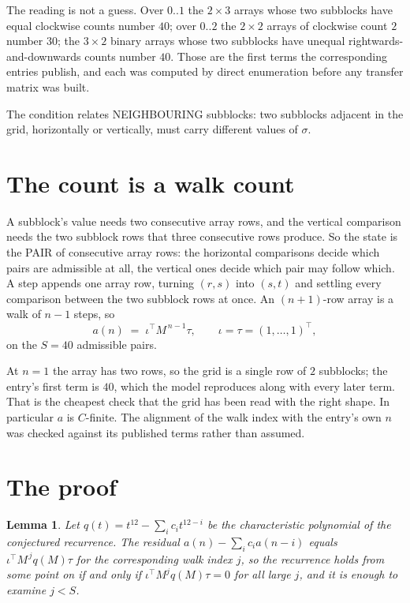 \documentclass[11pt,a4paper]{article}
\theoremstyle{plain}
\newtheorem{lemma}[theorem]{Lemma}
\theoremstyle{definition}
\begin{document}
The reading is not a guess. Over $0..1$ the $2\times3$ arrays whose two subblocks have equal
clockwise counts number $40$; over $0..2$ the $2\times2$ arrays of clockwise count $2$ number
$30$; the $3\times2$ binary arrays whose two subblocks have unequal rightwards-and-downwards
counts number $40$. Those are the first terms the corresponding entries publish, and each was
computed by direct enumeration before any transfer matrix was built.

The condition relates NEIGHBOURING subblocks: two subblocks adjacent in the grid, horizontally
or vertically, must carry different values of $\sigma$.

\section{The count is a walk count}

A subblock's value needs two consecutive array rows, and the vertical
comparison needs the two subblock rows that three consecutive rows produce. So the state is the
PAIR of consecutive array rows: the horizontal comparisons decide which pairs are admissible at
all, the vertical ones decide which pair may follow which. A step appends one array row,
turning $(r,s)$ into $(s,t)$ and settling every comparison between the two subblock rows at
once. An $(n+1)$-row array is a walk of $n-1$ steps, so
\[
a(n)\;=\;\iota^{\!\top}M^{\,n-1}\tau,\qquad\iota=\tau=(1,\dots,1)^{\!\top},
\]
on the $S=40$ admissible pairs.

At $n=1$ the array has two rows, so the grid is a single row of $2$
subblocks; the entry's first term is $40$, which the model
reproduces along with every later term. That is the cheapest check that the grid has been read
with the right shape.
In particular $a$ is $C$-finite. The alignment of the walk index with the entry's own $n$ was
checked against its published terms rather than assumed.

\section{The proof}

\begin{lemma}\label{lem:crit}
Let $q(t)=t^{12}-\sum_i c_it^{12-i}$ be the characteristic polynomial of the
conjectured recurrence. The residual $a(n)-\sum_ic_ia(n-i)$ equals
$\iota^{\!\top}M^{\,j}q(M)\tau$ for the corresponding walk index $j$, so the recurrence
holds from some point on if and only if $\iota^{\!\top}M^{j}q(M)\tau=0$ for all large $j$,
and it is enough to examine $j<S$.
\end{lemma}
\end{document}
